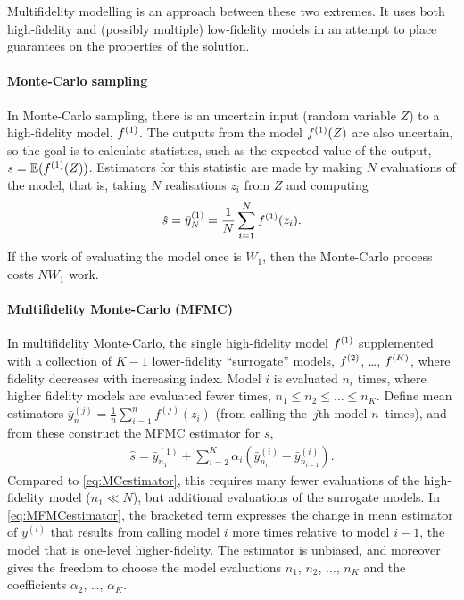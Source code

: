 Multifidelity modelling is an approach between these two extremes.
It uses both high-fidelity and (possibly multiple) low-fidelity models
in an attempt to place guarantees on the properties of the solution.

\paragraph{Monte-Carlo sampling}
In Monte-Carlo sampling, there is an uncertain input (random variable $Z$) to a high-fidelity model, $f^{(1)}$.
The outputs from the model $f^{(1)}(Z)$ are also uncertain,
so the goal is to calculate statistics,
such as the expected value of the output, $s=\mathbb{E}(f^{(1)}(Z))$.
Estimators for this statistic are made by making $N$ evaluations of the model,
that is, taking $N$ realisations $z_i$ from $Z$ and computing
\begin{align}
	\label{eq:MCestimator}
\hat{s}=\bar{y}^{(1)}_N = \frac{1}{N}\sum_{i=1}^Nf^{(1)}(z_i).
\end{align}
If the work of evaluating the model once is $W_1$, then the Monte-Carlo process costs $NW_1$ work.

\paragraph{Multifidelity Monte-Carlo (MFMC)}
In multifidelity Monte-Carlo, the single high-fidelity model $f^{(1)}$ supplemented with a collection of $K-1$ lower-fidelity ``surrogate'' models,
$f^{(2)}$, \ldots, $f^{(K)}$,
where fidelity decreases with increasing index.
Model $i$ is evaluated $n_i$ times, where higher fidelity models are evaluated fewer times, $n_1 \leq n_2 \leq \ldots \leq n_K$.
Define mean estimators $\bar{y}^{(j)}_{n} = \frac{1}{n}\sum_{i=1}^n f^{(j)}(z_i)$ (from calling
the~$j$th model $n$~times),
and from these construct the MFMC estimator for $s$,
\begin{align}
	\label{eq:MFMCestimator}
	\hat{s} = \bar{y}^{(1)}_{n_1} + \sum_{i=2}^{K}\alpha_i\left(\bar{y}^{(i)}_{n_i} - \bar{y}^{(i)}_{n_{i-1}} \right).
\end{align}
Compared to \eqref{eq:MCestimator}, this requires many fewer evaluations of the high-fidelity model ($n_1\ll N$),
but additional evaluations of the surrogate models.
In \eqref{eq:MFMCestimator}, the bracketed term expresses the change in mean estimator of $\bar{y}^{(i)}$ that results from calling model $i$ more times relative to model $i-1$, the model that is one-level higher-fidelity.
The estimator is unbiased,
and moreover gives the freedom to choose the model evaluations $n_1$, $n_2$, $\ldots$, $n_K$
and the coefficients $\alpha_2$, \ldots, $\alpha_K$.

